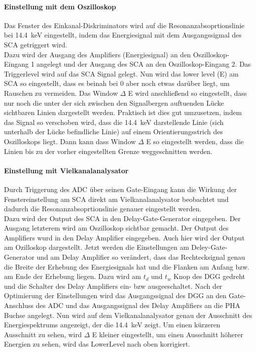 \documentclass[a4paper,twoside,final]{article}
\begin{document}
\paragraph{Einstellung mit dem Oszilloskop}
Das Fenster des Einkanal-Diskriminators wird auf die Resonanzabsoprtionslinie bei \SI{14,4}{\kilo\eV} eingestellt, indem das Energiesignal mit dem Ausgangssigmal des SCA getriggert wird. \\
Dazu wird der Ausgang des Amplifiers (Energiesignal) an den Oszilloskop-Eingang 1 angelegt und der Ausgang des SCA an den Oszilloskop-Eingang 2. Das Triggerlevel wird auf das SCA Signal gelegt. Nun wird das lower level (E) am SCA so eingestellt, dass es beinah bei 0 aber noch etwas darüber liegt, um Rauschen zu vermeiden. Das Window $\Delta$ E wird anschließend so eingestellt, dass nur noch die unter der sich zwischen den Signalbergen auftuenden Lücke sichtbaren Linien dargestellt werden. Praktisch ist dies gut umzusetzen, indem das Signal so verschoben wird, dass die \SI{14,4}{\kilo\eV} darstellende Linie (sich unterhalb der Lücke befindliche Linie) auf einem Orientierungsstrich des Oszilloskops liegt. Dann kann dass Window $\Delta$ E so eingestellt werden, dass die Linien bis zu der vorher eingestellten Grenze weggeschnitten werden.

\paragraph{Einstellung mit Vielkanalanalysator}
Durch Triggerung des  ADC über seinen Gate-Eingang kann die Wirkung der Fenstereinstellung am SCA direkt am Vielkanalanalysator beobachtet und dadurch die Resonanzabsoprtionslinie genauer eingestellt werden. \\
Dazu wird der Output des SCA in den Delay-Gate-Generator eingegeben. Der Ausgang letzterem wird am Oszilloskop sichtbar gemacht. Der Output des Amplifiers wurd in den Delay Amplifier eingegeben. Auch hier wird der Output am Ozilloskop dargestellt. Jetzt werden die Einstellungen am Deley-Gate-Generator und am Delay Amplifier so verändert, dass das Rechtecksignal genau die Breite der Erhebung des Energiesignals hat und die Flanken am Anfang bzw. am Ende der Erhebung liegen. Dazu wird am $t_d$ und $t_w$ Knop des DGG gedreht und die Schalter des Delay Amplifiers ein- bzw ausgeeschaltet. Nach der Optimierung der Einstellungen wird das Ausgangssignal des DGG an den Gate-Anschluss des ADC und das Ausgangssignal des Delay Amplifiers an die PHA Buchse angelegt. Nun wird auf dem Vielkanalanalysator genau der Ausschnitt des Energiespektrums angezeigt, der die \SI{14,4}{\kilo\eV} zeigt. Um einen kürzeren Ausschnitt zu sehen, wird $\Delta$ E kleiner eingestellt, um einen Ausschnitt höherer Energien zu sehen, wird das LowerLevel nach oben korrigiert. \\
\end{document}
